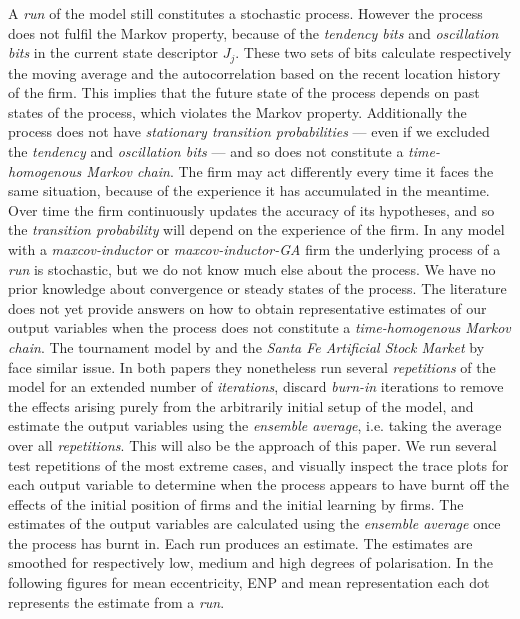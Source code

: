 \documentclass[preprint, 12pt]{elsarticle}
\begin{document}
A \emph{run} of the model still constitutes a stochastic process. However the process does not fulfil the Markov property, because of the \emph{tendency bits} and \emph{oscillation bits} in the current state descriptor $J_j$. These two sets of bits calculate respectively the moving average and the autocorrelation based on the recent location history of the firm. This implies that the future state of the process depends on past states of the process, which violates the Markov property. Additionally the process does not have \emph{stationary transition probabilities} — even if we excluded the \emph{tendency} and \emph{oscillation bits} — and so does not constitute a \emph{time-homogenous Markov chain}. The firm may act differently every time it faces the same situation, because of the experience it has accumulated in the meantime. Over time the firm continuously updates the accuracy of its hypotheses, and so the \emph{transition probability} will depend on the experience of the firm. In any model with a \emph{maxcov-inductor} or \emph{maxcov-inductor-GA} firm the underlying process of a \emph{run} is stochastic, but we do not know much else about the process. We have no prior knowledge about convergence or steady states of the process. The literature does not yet provide answers on how to obtain representative estimates of our output variables when the process does not constitute a \emph{time-homogenous Markov chain}. The tournament model by \citet{Fowler_Laver_2008} and the \emph{Santa Fe Artificial Stock Market} by \citet[chapter~3]{Arthur_2014} face similar issue. In both papers they nonetheless run several \emph{repetitions} of the model for an extended number of \emph{iterations}, discard \emph{burn-in} iterations to remove the effects arising purely from the arbitrarily initial setup of the model, and estimate the output variables using the \emph{ensemble average}, i.e. taking the average over all \emph{repetitions}. This will also be the approach of this paper. We run several test repetitions of the most extreme cases, and visually inspect the trace plots for each output variable to determine when the process appears to have burnt off the effects of the initial position of firms and the initial learning by firms. The estimates of the output variables are calculated using the \emph{ensemble average} once the process has burnt in. Each run produces an estimate. The estimates are smoothed for respectively low, medium and high degrees of polarisation. In the following figures for mean eccentricity, ENP and mean representation each dot represents the estimate from a \emph{run}.
\end{document}
